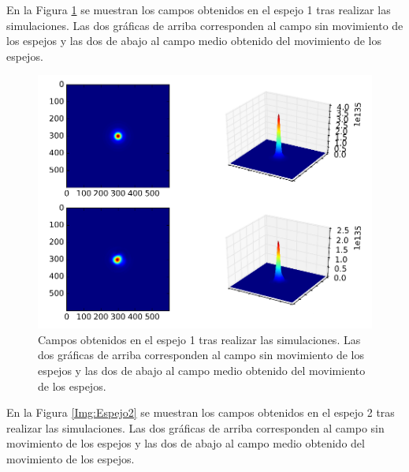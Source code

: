 \documentclass[twoside]{article}
\begin{document}
\begin{multicols}{2}
				En la Figura \ref{Img:Espejo1} se muestran los campos obtenidos en el espejo 1 tras realizar las simulaciones. Las dos gráficas de arriba corresponden al campo sin movimiento de los espejos y las dos de abajo al campo medio obtenido del movimiento de los espejos.

					\begin{figure}[H]
						\centering
						\includegraphics[scale=0.25]{FiguraEspejo1.png}
						\caption{\label{Img:Espejo1}Campos obtenidos en el espejo 1 tras realizar las simulaciones. Las dos gráficas de arriba corresponden al campo sin movimiento de los espejos y las dos de abajo al campo medio obtenido del movimiento de los espejos.}
					\end{figure}

				En la Figura \ref{Img:Espejo2} se muestran los campos obtenidos en el espejo 2 tras realizar las simulaciones. Las dos gráficas de arriba corresponden al campo sin movimiento de los espejos y las dos de abajo al campo medio obtenido del movimiento de los espejos.


\end{multicols}
\end{document}
